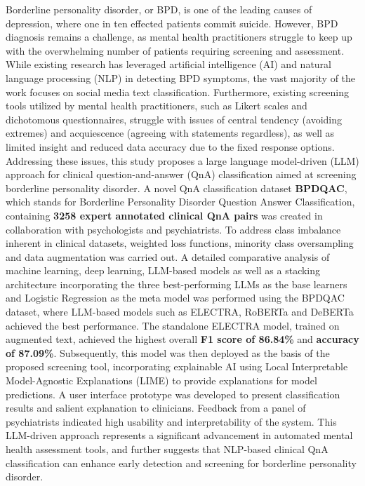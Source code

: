 \justifying
Borderline personality disorder, or BPD, is one of the leading causes of depression, where one in ten effected patients commit suicide. However, BPD diagnosis remains a challenge, as mental health practitioners struggle to keep up with the overwhelming number of patients requiring screening and assessment. While existing research has leveraged artificial intelligence (AI) and natural language processing (NLP) in detecting BPD symptoms, the vast majority of the work focuses on social media text classification. Furthermore, existing screening tools utilized by mental health practitioners, such as Likert scales and dichotomous questionnaires,  struggle with issues of central tendency (avoiding extremes) and acquiescence (agreeing with statements regardless), as well as limited insight and reduced data accuracy due to the fixed response options. Addressing these issues, this study proposes a large language model-driven (LLM) approach for clinical question-and-answer (QnA) classification aimed at screening borderline personality disorder.
A novel QnA classification dataset \textbf{BPDQAC}, which stands for Borderline Personality Disorder Question Answer Classification, containing \textbf{3258 expert annotated clinical QnA pairs} was created in collaboration with psychologists and psychiatrists.
To address class imbalance inherent in clinical datasets, weighted loss functions, minority class oversampling and data augmentation was carried out.
A detailed comparative analysis of machine learning, deep learning, LLM-based models as well as a stacking architecture incorporating the three best-performing LLMs as the base learners and Logistic Regression as the meta model was performed using the BPDQAC dataset, where LLM-based models such as ELECTRA, RoBERTa and DeBERTa achieved the best performance.
The standalone ELECTRA model, trained on augmented text, achieved the highest overall \textbf{F1 score of 86.84\%} and \textbf{accuracy of 87.09\%}. Subsequently, this model was then deployed as the basis of the proposed screening tool, incorporating explainable AI using Local Interpretable Model-Agnostic Explanations (LIME) to provide explanations for model predictions.  
A user interface prototype was developed to present classification results and salient explanation to clinicians.
Feedback from a panel of psychiatrists indicated high usability and interpretability of the system.
This LLM-driven approach represents a significant advancement in automated mental health assessment tools, and further suggests that NLP-based clinical QnA classification can enhance early detection and screening for borderline personality disorder.

